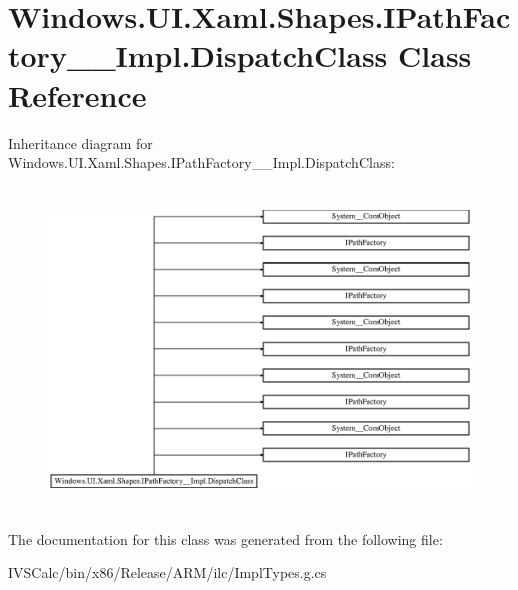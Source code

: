 \hypertarget{class_windows_1_1_u_i_1_1_xaml_1_1_shapes_1_1_i_path_factory_____impl_1_1_dispatch_class}{}\section{Windows.\+U\+I.\+Xaml.\+Shapes.\+I\+Path\+Factory\+\_\+\+\_\+\+Impl.\+Dispatch\+Class Class Reference}
\label{class_windows_1_1_u_i_1_1_xaml_1_1_shapes_1_1_i_path_factory_____impl_1_1_dispatch_class}
Inheritance diagram for Windows.\+U\+I.\+Xaml.\+Shapes.\+I\+Path\+Factory\+\_\+\+\_\+\+Impl.\+Dispatch\+Class\+:\begin{figure}[H]
\begin{center}
\leavevmode
\includegraphics[height=8.579387cm]{class_windows_1_1_u_i_1_1_xaml_1_1_shapes_1_1_i_path_factory_____impl_1_1_dispatch_class}
\end{center}
\end{figure}


The documentation for this class was generated from the following file\+:\begin{DoxyCompactItemize}
\item 
I\+V\+S\+Calc/bin/x86/\+Release/\+A\+R\+M/ilc/Impl\+Types.\+g.\+cs\end{DoxyCompactItemize}
